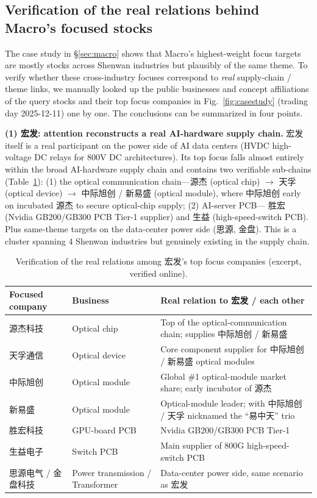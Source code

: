 \documentclass[a4paper,11pt]{article}
\begin{document}
\subsection{Verification of the real relations behind Macro's focused stocks}\label{sec:casestudy-rel}
The case study in \S\ref{sec:macro} shows that Macro's highest-weight focus
targets are mostly stocks across Shenwan industries but plausibly of the same
theme. To verify whether these cross-industry focuses correspond to
\emph{real} supply-chain / theme links, we manually looked up the public
businesses and concept affiliations of the query stocks and their top focus
companies in Fig.~\ref{fig:casestudy} (trading day 2025-12-11) one by one. The
conclusions can be summarized in four points.

\textbf{(1) 宏发: attention reconstructs a real AI-hardware supply
chain.} 宏发 itself is a real participant on the power side of AI data
centers (HVDC high-voltage DC relays for 800V DC architectures). Its top focus
falls almost entirely within the broad AI-hardware supply chain and contains
two verifiable sub-chains (Table~\ref{tab:casestudy}): (1) the optical
communication chain---源杰 (optical chip) $\to$ 天孚 (optical device) $\to$
中际旭创 / 新易盛 (optical module), where 中际旭创 early
on incubated 源杰 to secure optical-chip supply; (2) AI-server PCB---
胜宏 (Nvidia GB200/GB300 PCB Tier-1 supplier) and 生益
(high-speed-switch PCB). Plus same-theme targets on the data-center power side
(思源, 金盘). This is a cluster spanning $4$ Shenwan industries but
genuinely existing in the supply chain.

\begin{table}[H]
\centering
\caption{Verification of the real relations among 宏发's top focus companies
(excerpt, verified online).}
\label{tab:casestudy}
\begin{tabular}{lll}
\toprule
Focused company & Business & Real relation to 宏发 / each other \\
\midrule
源杰科技 & Optical chip & Top of the optical-communication chain; supplies 中际旭创 / 新易盛 \\
天孚通信 & Optical device & Core component supplier for 中际旭创 / 新易盛 optical modules \\
中际旭创 & Optical module & Global \#1 optical-module market share; early incubator of 源杰 \\
新易盛   & Optical module & Optical-module leader; with 中际旭创 / 天孚 nicknamed the ``易中天'' trio \\
胜宏科技 & GPU-board PCB & Nvidia GB200/GB300 PCB Tier-1 \\
生益电子 & Switch PCB & Main supplier of 800G high-speed-switch PCB \\
思源电气 / 金盘科技 & Power transmission / Transformer & Data-center power side, same scenario as 宏发 \\
\bottomrule
\end{tabular}
\end{table}
\end{document}
